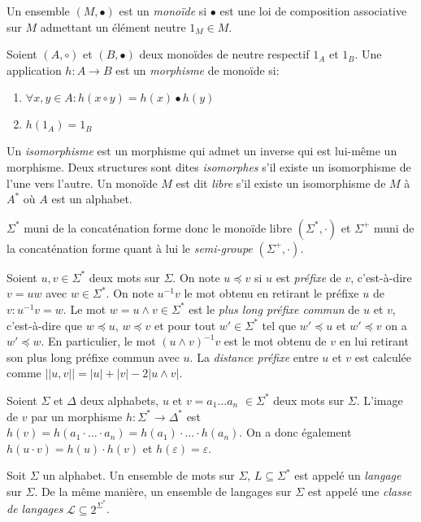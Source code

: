	\begin{definition}[Monoïde]
		Un ensemble $(M, \bullet)$ est un \emph{monoïde} si $\bullet$ est une loi de composition associative sur $M$ admettant un élément neutre $1_M \in M$.
	\end{definition}
    
    Soient $(A, \circ)$ et $(B, \bullet)$ deux monoïdes de neutre respectif $1_A$ et $1_B$. Une application $h: A\to B$ est un \emph{morphisme} de monoïde si:
    \begin{enumerate}
		\item $\forall x,y \in A : h(x \circ y) = h(x) \bullet h(y)$ 
		\item $h(1_A) = 1_B$ \\
	\end{enumerate}
	Un \emph{isomorphisme} est un morphisme qui admet un inverse qui est lui-même un morphisme. Deux structures sont dites \emph{isomorphes} s'il existe un isomorphisme de l'une vers l'autre. Un monoïde $M$ est dit \emph{libre} s'il existe un isomorphisme de $M$ à $A^*$ où $A$ est un alphabet.

    $\Sigma^*$ muni de la concaténation forme donc le monoïde libre $(\Sigma^*, \cdot)$ et $\Sigma^+$ muni de la concaténation forme quant à lui le \emph{semi-groupe} $(\Sigma^+, \cdot)$.
    
    Soient $u,v \in \Sigma^*$ deux mots sur $\Sigma$. On note $u \preceq v$ si $u$ est \emph{préfixe} de $v$, c'est-à-dire $v = uw$ avec $w \in \Sigma^*$. On note $u^{-1}v$ le mot obtenu en retirant le préfixe $u$ de $v : u^{-1}v = w$. Le mot $w = u \wedge v \in \Sigma^*$ est le \emph{plus long préfixe commun} de $u$ et $v$, c'est-à-dire que $w \preceq u$, $w \preceq v$ et pour tout $w' \in \Sigma^*$ tel que $w' \preceq u$ et $w' \preceq v$ on a $w' \preceq w$. En particulier, le mot $(u \wedge v)^{-1}v$ est le mot obtenu de $v$ en lui retirant son plus long préfixe commun avec $u$. La \emph{distance préfixe} entre $u$ et $v$ est calculée comme $||u,v|| = |u|+|v|-2|u \wedge v|$.
    
    Soient $\Sigma$ et $\Delta$ deux alphabets, $u$ et $v = a_1\ldots a_n$ $\in \Sigma^*$ deux mots sur $\Sigma$. L'image de $v$ par un morphisme $h: \Sigma^*\to \Delta^*$ est $h(v) = h(a_1\cdot \ldots \cdot a_n) = h(a_1)\cdot \ldots \cdot h(a_n)$. On a donc également $h(u \cdot v) = h(u) \cdot h(v)$ et $h(\varepsilon) = \varepsilon$.
    
    Soit $\Sigma$ un alphabet. Un ensemble de mots sur $\Sigma$, $L \subseteq \Sigma^*$ est appelé un \emph{langage} sur $\Sigma$. De la même manière, un ensemble de langages sur $\Sigma$ est appelé une \emph{classe de langages} $\mathcal{L} \subseteq 2^{\Sigma^*}$. \\


